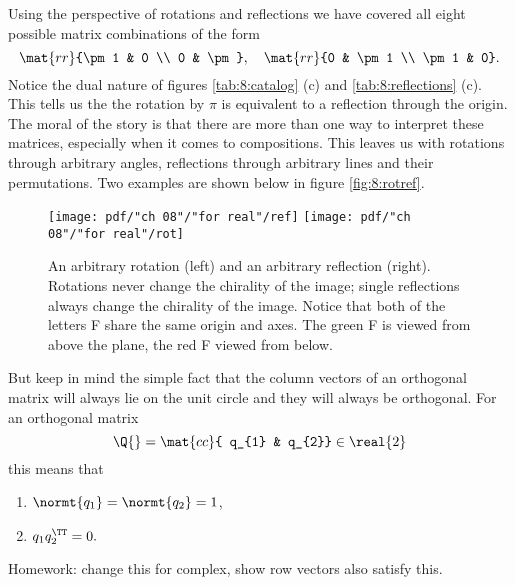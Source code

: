 Using the perspective of rotations and reflections we have covered all eight possible matrix combinations of the form
\begin{equation}
  \mat{rr}{\pm 1 & 0 \\ 0 & \pm}, \quad \mat{rr}{0 & \pm 1 \\ \pm 1 & 0}.
\end{equation}
Notice the dual nature of figures \eqref{tab:8:catalog} (c) and  \eqref{tab:8:reflections} (c). This tells us the the rotation by $\pi$ is equivalent to a reflection through the origin. The moral of the story is that there are more than one way to interpret these matrices, especially when it comes to compositions. This leaves us with rotations through arbitrary angles, reflections through arbitrary lines and their permutations. Two examples are shown below in figure \eqref{fig:8:rotref}.
\begin{figure}[htbp] %
   \centering
   \texttt{[image: pdf/"ch 08"/"for real"/ref]} \qquad
   \texttt{[image: pdf/"ch 08"/"for real"/rot]} 
   \caption[An arbitrary rotation and an arbitrary reflection.]{An arbitrary rotation (left) and an arbitrary reflection (right). Rotations never change the chirality of the image; single reflections always change the chirality of the image. Notice that both of the letters F share the same origin and axes. The green F is viewed from above the plane, the red F viewed from below.}
   \label{fig:8:rotref}
\end{figure}

But keep in mind the simple fact that the column vectors of an orthogonal matrix will always lie on the unit circle and they will always be orthogonal. For an orthogonal matrix
\begin{equation}
  \Q{} = \mat{cc}{ q_{1} & q_{2}} \in \real{2}
\end{equation}
this means that
\begin{enumerate}
\item $\normt{ q_{1} } = \normt{ q_{2} } = 1$,
\item $q_{1}q_{2}^{\TT}= 0.$
\end{enumerate}
Homework: change this for complex, show row vectors also satisfy this.

 
\endinput